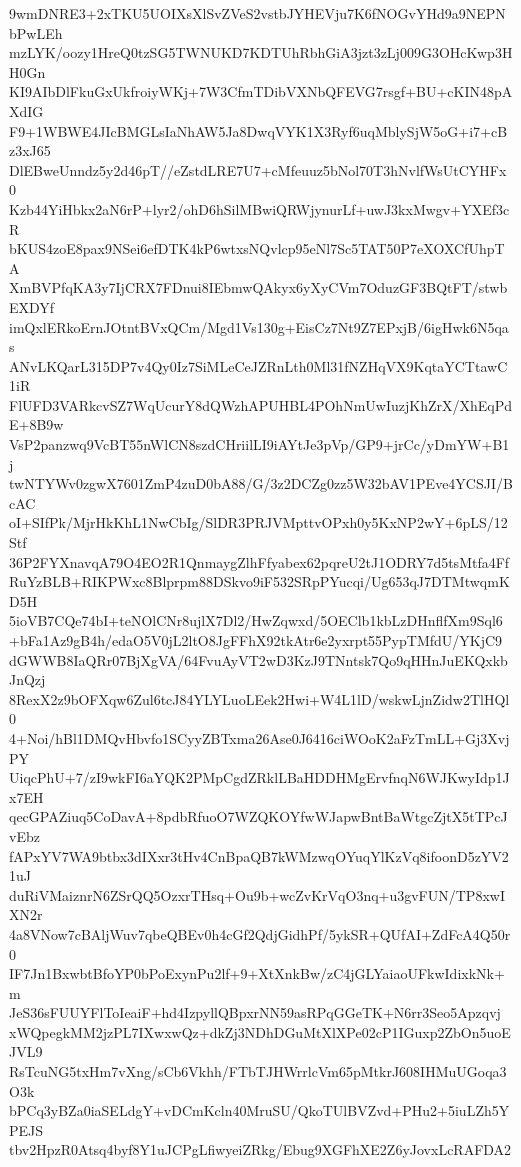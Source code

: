 9wmDNRE3+2xTKU5UOIXsXlSvZVeS2vstbJYHEVju7K6fNOGvYHd9a9NEPNbPwLEh
mzLYK/oozy1HreQ0tzSG5TWNUKD7KDTUhRbhGiA3jzt3zLj009G3OHcKwp3HH0Gn
KI9AIbDlFkuGxUkfroiyWKj+7W3CfmTDibVXNbQFEVG7rsgf+BU+cKIN48pAXdIG
F9+1WBWE4JIcBMGLsIaNhAW5Ja8DwqVYK1X3Ryf6uqMblySjW5oG+i7+cBz3xJ65
DlEBweUnndz5y2d46pT//eZstdLRE7U7+cMfeuuz5bNol70T3hNvlfWsUtCYHFx0
Kzb44YiHbkx2aN6rP+lyr2/ohD6hSilMBwiQRWjynurLf+uwJ3kxMwgv+YXEf3cR
bKUS4zoE8pax9NSei6efDTK4kP6wtxsNQvlcp95eNl7Sc5TAT50P7eXOXCfUhpTA
XmBVPfqKA3y7IjCRX7FDnui8IEbmwQAkyx6yXyCVm7OduzGF3BQtFT/stwbEXDYf
imQxlERkoErnJOtntBVxQCm/Mgd1Vs130g+EisCz7Nt9Z7EPxjB/6igHwk6N5qas
ANvLKQarL315DP7v4Qy0Iz7SiMLeCeJZRnLth0Ml31fNZHqVX9KqtaYCTtawC1iR
FlUFD3VARkcvSZ7WqUcurY8dQWzhAPUHBL4POhNmUwIuzjKhZrX/XhEqPdE+8B9w
VsP2panzwq9VcBT55nWlCN8szdCHriilLI9iAYtJe3pVp/GP9+jrCc/yDmYW+B1j
twNTYWv0zgwX7601ZmP4zuD0bA88/G/3z2DCZg0zz5W32bAV1PEve4YCSJI/BcAC
oI+SIfPk/MjrHkKhL1NwCbIg/SlDR3PRJVMpttvOPxh0y5KxNP2wY+6pLS/12Stf
36P2FYXnavqA79O4EO2R1QnmaygZlhFfyabex62pqreU2tJ1ODRY7d5tsMtfa4Ff
RuYzBLB+RIKPWxc8Blprpm88DSkvo9iF532SRpPYucqi/Ug653qJ7DTMtwqmKD5H
5ioVB7CQe74bI+teNOlCNr8ujlX7Dl2/HwZqwxd/5OEClb1kbLzDHnflfXm9Sql6
+bFa1Az9gB4h/edaO5V0jL2ltO8JgFFhX92tkAtr6e2yxrpt55PypTMfdU/YKjC9
dGWWB8IaQRr07BjXgVA/64FvuAyVT2wD3KzJ9TNntsk7Qo9qHHnJuEKQxkbJnQzj
8RexX2z9bOFXqw6Zul6tcJ84YLYLuoLEek2Hwi+W4L1lD/wskwLjnZidw2TlHQl0
4+Noi/hBl1DMQvHbvfo1SCyyZBTxma26Ase0J6416ciWOoK2aFzTmLL+Gj3XvjPY
UiqcPhU+7/zI9wkFI6aYQK2PMpCgdZRklLBaHDDHMgErvfnqN6WJKwyIdp1Jx7EH
qecGPAZiuq5CoDavA+8pdbRfuoO7WZQKOYfwWJapwBntBaWtgcZjtX5tTPcJvEbz
fAPxYV7WA9btbx3dIXxr3tHv4CnBpaQB7kWMzwqOYuqYlKzVq8ifoonD5zYV21uJ
duRiVMaiznrN6ZSrQQ5OzxrTHsq+Ou9b+wcZvKrVqO3nq+u3gvFUN/TP8xwIXN2r
4a8VNow7cBAljWuv7qbeQBEv0h4cGf2QdjGidhPf/5ykSR+QUfAI+ZdFcA4Q50r0
IF7Jn1BxwbtBfoYP0bPoExynPu2lf+9+XtXnkBw/zC4jGLYaiaoUFkwIdixkNk+m
JeS36sFUUYFlToIeaiF+hd4IzpyllQBpxrNN59asRPqGGeTK+N6rr3Seo5Apzqvj
xWQpegkMM2jzPL7IXwxwQz+dkZj3NDhDGuMtXlXPe02cP1IGuxp2ZbOn5uoEJVL9
RsTcuNG5txHm7vXng/sCb6Vkhh/FTbTJHWrrlcVm65pMtkrJ608IHMuUGoqa3O3k
bPCq3yBZa0iaSELdgY+vDCmKcln40MruSU/QkoTUlBVZvd+PHu2+5iuLZh5YPEJS
tbv2HpzR0Atsq4byf8Y1uJCPgLfiwyeiZRkg/Ebug9XGFhXE2Z6yJovxLcRAFDA2
